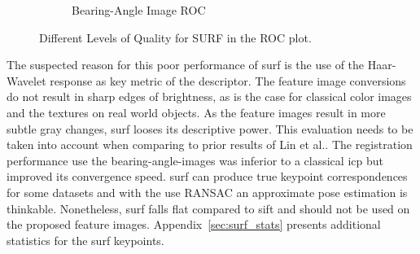 \begin{figure}[htp]
\begin{subfigure}[t]{0.45\linewidth}
    \caption{Bearing-Angle Image ROC}
\end{subfigure}
    \caption{Different Levels of Quality for SURF in the ROC plot.}
\end{figure}
The suspected reason for this poor performance of \acrshort{surf} is the use of the Haar-Wavelet response as key metric of the descriptor.
The feature image conversions do not result in sharp edges of brightness, as is the case for classical color images and the textures on real world objects.
As the feature images result in more subtle gray changes, \acrshort{surf} looses its descriptive power.
This evaluation needs to be taken into account when comparing to prior results of Lin et al.\cite{lin_easp2017}.
The registration performance use the \glspl{bearing-angle-image} was inferior to a classical \acrshort{icp} but improved its convergence speed.
\acrshort{surf} can produce true keypoint correspondences for some datasets and with the use \acrshort{RANSAC} an approximate pose estimation is thinkable.
Nonetheless, \acrshort{surf} falls flat compared to \acrshort{sift} and should not be used on the proposed feature images.
Appendix~\ref{sec:surf_stats} presents additional statistics for the \acrshort{surf} keypoints.
